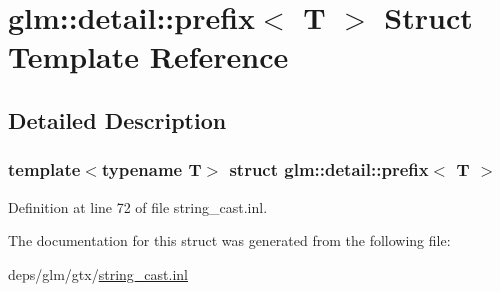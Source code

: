 \hypertarget{structglm_1_1detail_1_1prefix}{}\section{glm\+:\+:detail\+:\+:prefix$<$ T $>$ Struct Template Reference}
\label{structglm_1_1detail_1_1prefix}


\subsection{Detailed Description}
\subsubsection*{template$<$typename T$>$\newline
struct glm\+::detail\+::prefix$<$ T $>$}



Definition at line 72 of file string\+\_\+cast.\+inl.



The documentation for this struct was generated from the following file\+:\begin{DoxyCompactItemize}
\item 
deps/glm/gtx/\hyperlink{string__cast_8inl}{string\+\_\+cast.\+inl}\end{DoxyCompactItemize}
